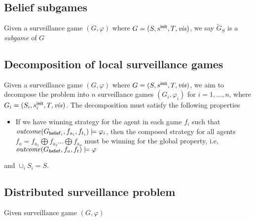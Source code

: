 \subsection{Belief subgames}
Given a surveillance game $(G,\varphi)$ where $G = (S,s^{\mathsf{init}},T,\mathit{vis})$, we say $\tilde{G}_S$ is a \emph{subgame} of $G$

\subsection{Decomposition of local surveillance games}
Given a surveillance game $(G,\varphi)$ where $G = (S,s^{\mathsf{init}},T,\mathit{vis})$, we aim to decompose the problem into $n$ surveillance games $(G_i,\varphi_i)$ for $i = 1,\dots,n$, where $G_i = (S_i,s^{\mathsf{init}}_i,T,\mathit{vis})$. The decomposition must satisfy the following properties
\begin{itemize}
\item If we have winning strategy for the agent in each game $f_i$ such that $\mathit{outcome}(G_{\mathsf{belief}_i},f_{a_i},f_{t_i}) \models \varphi_i$, then the composed strategy for all agents $f_a = f_{a_1} \bigoplus f_{a_2} \dots \bigoplus f_{a_n}$ must be winning for the global property, i.e, $\mathit{outcome}(G_{\mathsf{belief}},f_{a},f_{t}) \models \varphi$
\end{itemize}


and $\cup_iS_i = S$. 



\subsection{Distributed surveillance problem}



Given surveillance game  $(G,\varphi)$